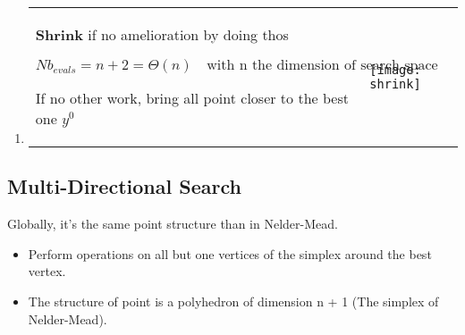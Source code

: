 \begin{enumerate}
    \item \begin{tabular}{m{11cm}m{3cm}}
            \textbf{Shrink} if no amelioration by doing thos 

            $$Nb_{evals} = n+2 = \Theta(n) \quad \textrm{with n the
            dimension of search space}$$ 

            If no other work, bring all point closer to the best one
            $y^0$
            & 
            \texttt{[image: shrink]}
        \end{tabular}
\end{enumerate}


\subsection{Multi-Directional Search}

Globally, it's the same point structure than in Nelder-Mead.
\begin{itemize}
    \item Perform operations on all but one vertices of the simplex around
        the best vertex.

    \item The structure of point is a polyhedron of dimension n + 1 (The
        simplex of Nelder-Mead).
\end{itemize}

